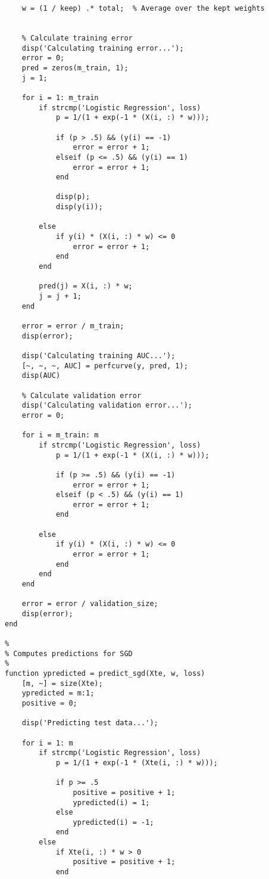\documentclass[11pt, oneside]{article}   	%
\begin{document}
\begin{verbatim}
    w = (1 / keep) .* total;  % Average over the kept weights
    
    
    % Calculate training error
    disp('Calculating training error...');
    error = 0;
    pred = zeros(m_train, 1);
    j = 1;
    
    for i = 1: m_train
        if strcmp('Logistic Regression', loss)
            p = 1/(1 + exp(-1 * (X(i, :) * w)));

            if (p > .5) && (y(i) == -1)
                error = error + 1;
            elseif (p <= .5) && (y(i) == 1)
                error = error + 1;
            end
            
            disp(p);
            disp(y(i));
            
        else
            if y(i) * (X(i, :) * w) <= 0
                error = error + 1;
            end
        end
        
        pred(j) = X(i, :) * w;
        j = j + 1;
    end
    
    error = error / m_train;
    disp(error);
    
    disp('Calculating training AUC...');
    [~, ~, ~, AUC] = perfcurve(y, pred, 1);
    disp(AUC)

    % Calculate validation error
    disp('Calculating validation error...');
    error = 0;
    
    for i = m_train: m
        if strcmp('Logistic Regression', loss)
            p = 1/(1 + exp(-1 * (X(i, :) * w)));

            if (p >= .5) && (y(i) == -1)
                error = error + 1;
            elseif (p < .5) && (y(i) == 1)
                error = error + 1;
            end
            
        else
            if y(i) * (X(i, :) * w) <= 0
                error = error + 1;
            end
        end
    end
    
    error = error / validation_size;
    disp(error);
end

%
% Computes predictions for SGD
%
function ypredicted = predict_sgd(Xte, w, loss)
    [m, ~] = size(Xte);
    ypredicted = m:1;
    positive = 0;
    
    disp('Predicting test data...');
    
    for i = 1: m
        if strcmp('Logistic Regression', loss)
            p = 1/(1 + exp(-1 * (Xte(i, :) * w)));

            if p >= .5
                positive = positive + 1;
                ypredicted(i) = 1;
            else
                ypredicted(i) = -1;
            end
        else
            if Xte(i, :) * w > 0
                positive = positive + 1;
            end


\end{verbatim}
\end{document}
